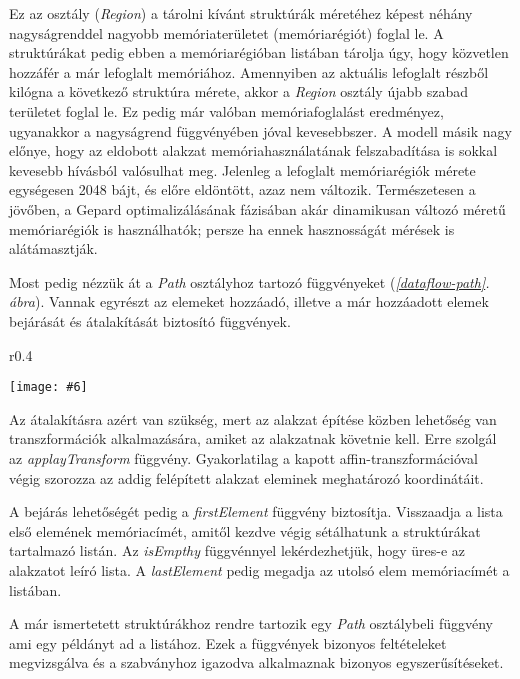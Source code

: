 \documentclass[12pt]{report}
\makeatletter
\theoremstyle{definition}
\newcommand{\func}[1]{{\textsl{#1}}}
\newcommand{\melyikoldalra}{r}
\newlength{\Xoffset}
\newlength{\Yoffset}
\newcommand*{\setpdfoffset}[2]{%
  \setlength{\Xoffset}{#1}%
  \setlength{\Yoffset}{#2}%
}
\newcommand*{\setviewport}[4]{%
  \def\x@viewport{%
    {\the\dimexpr#1-\Xoffset}
    {\the\dimexpr#2-\Yoffset}
    {\the\dimexpr#3-\Xoffset}
    {\the\dimexpr#4-\Yoffset}%
  }%
}
\newcommand{\includegraphicskivagas}[6]{
    \setpdfoffset{0pt}{0pt}
    \setviewport{#1}{#2}{#3}{#4}
    \texttt{[image: \#6]}
}
\newcommand{\includedataflowkivagas}[5]{
    \includegraphicskivagas{#1}{#2}{#3}{#4}{scale=0.6,#5}
    {img/built/dataflow_eps}
}
\makeatother
\begin{document}
Ez az osztály (\func{Region}) a tárolni kívánt struktúrák méretéhez képest
néhány nagyságrenddel nagyobb memóriaterületet (memóriarégiót) foglal le. A
struktúrákat pedig ebben a memóriarégióban listában tárolja úgy, hogy közvetlen
hozzáfér a már lefoglalt memóriához. Amennyiben az aktuális lefoglalt részből
kilógna a következő struktúra mérete, akkor a \func{Region} osztály újabb
szabad területet foglal le. Ez pedig már valóban memóriafoglalást eredményez,
ugyanakkor a nagyságrend függvényében jóval kevesebbszer. A modell másik nagy
előnye, hogy az eldobott alakzat memóriahasználatának felszabadítása is sokkal
kevesebb hívásból valósulhat meg. Jelenleg a lefoglalt memóriarégiók mérete
egységesen 2048 bájt, és előre eldöntött, azaz nem változik. Természetesen a
jövőben, a Gepard optimalizálásának fázisában akár dinamikusan változó méretű
memóriarégiók is használhatók; persze ha ennek hasznosságát mérések is
alátámasztják.

Most pedig nézzük át a \func{Path} osztályhoz tartozó függvényeket
(\emph{\ref{dataflow-path}. ábra}). Vannak egyrészt az elemeket
hozzáadó, illetve a már hozzáadott elemek bejárását és átalakítását biztosító
függvények.

  \begin{wrapfigure}{\melyikoldalra}{0.4\textwidth}
    \begin{center}
      \includedataflowkivagas{153pt}{355pt}{345pt}{595pt}{}
    \end{center}
    \caption{\label{dataflow-path} A belső Path API részei}
  \end{wrapfigure}

Az átalakításra azért van szükség, mert az alakzat építése közben lehetőség van
transzformációk alkalmazására, amiket az alakzatnak követnie kell. Erre szolgál
az \func{applayTransform} függvény. Gyakorlatilag a kapott
affin-transzformációval végig szorozza az addig felépített alakzat eleminek
meghatározó koordinátáit.

A bejárás lehetőségét pedig a \func{firstElement} függvény biztosítja.
Visszaadja a lista első elemének memóriacímét, amitől kezdve végig sétálhatunk
a struktúrákat tartalmazó listán. Az \func{isEmpthy} függvénnyel
lekérdezhetjük, hogy üres-e az alakzatot leíró lista. A \func{lastElement}
pedig megadja az utolsó elem memóriacímét a listában.

A már ismertetett struktúrákhoz rendre tartozik egy \func{Path} osztálybeli
függvény ami egy példányt ad a listához. Ezek a függvények bizonyos
feltételeket megvizsgálva és a szabványhoz igazodva alkalmaznak bizonyos
egyszerűsítéseket.
\end{document}

